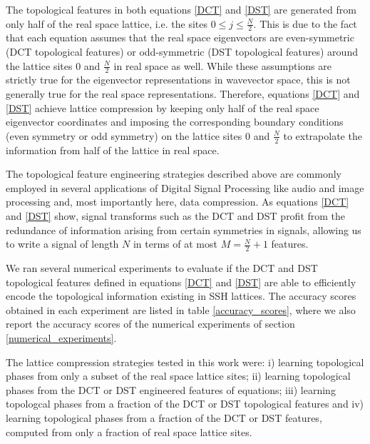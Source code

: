 \documentclass[10pt]{revtex4-1}
\begin{document}
The topological features in both equations \eqref{DCT} and \eqref{DST} are generated from only half of the real space lattice, i.e. the sites $0 \leq j \leq \frac{N}{2}$. This is due to the fact that each equation assumes that the real space eigenvectors are even-symmetric (DCT topological features) or odd-symmetric (DST topological features) around the lattice sites $0$ and $\frac{N}{2}$ in real space as well. While these assumptions are strictly true for the eigenvector representations in wavevector space, this is not generally true for the real space representations. Therefore, equations \eqref{DCT} and \eqref{DST} achieve lattice compression by keeping only half of the real space eigenvector coordinates and imposing the corresponding boundary conditions (even symmetry or odd symmetry) on the lattice sites $0$ and $\frac{N}{2}$ to extrapolate the information from half of the lattice in real space. 

The topological feature engineering strategies described above are commonly employed in several applications of Digital Signal Processing like audio and image processing and, most importantly here, data compression. As equations \eqref{DCT} and \eqref{DST} show, signal transforms such as the DCT and DST profit from the redundance of information arising from certain symmetries in signals, allowing us to write a signal of length $N$ in terms of at most $M = \frac{N}{2}+1$ features. 
   
We ran several numerical experiments to evaluate if the DCT and DST topological features defined in equations \eqref{DCT} and \eqref{DST}  are able to efficiently encode the topological information existing in SSH lattices. The accuracy scores obtained in each experiment are listed in table \ref{accuracy_scores}, where we also report the accuracy scores of the numerical experiments of section \ref{numerical_experiments}.

The lattice compression strategies tested in this work were: i) learning topological phases from only a subset of the real space lattice sites; ii) learning topological phases from the DCT or DST engineered features of equations; iii) learning topologcal phases from a fraction of the DCT or DST topological features and iv) learning topological phases from a fraction of the DCT or DST features, computed from only a fraction of real space lattice sites. 
\end{document}
